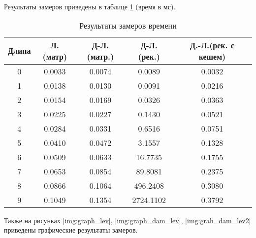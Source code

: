 Результаты замеров приведены в таблице \ref{tbl:time_mes} (время в мс).

\begin{table}[h]
    \begin{center}
        \begin{threeparttable}
        \captionsetup{justification=raggedright,singlelinecheck=off}
        \caption{Результаты замеров времени}
        \label{tbl:time_mes}
        \begin{tabular}{|c|c|c|c|c|}
            \hline
            Длина & Л.(матр) & Д-Л.(матр.)& Д-Л.(рек.) & Д.-Л.(рек. с кешем)  \\
            \hline
            0 & 0.0033 & 0.0074 & 0.0089 & 0.0032 \\
            \hline
            1 & 0.0138 & 0.0130 & 0.0091 & 0.0216 \\ 
            \hline
            2 & 0.0154 & 0.0169 & 0.0326 & 0.0363 \\ 
            \hline
            3 & 0.0225 & 0.0227 & 0.1430 & 0.0521 \\ 
            \hline
            4 & 0.0284 & 0.0331 & 0.6516 & 0.0751 \\ 
            \hline
            5 & 0.0410 & 0.0472 & 3.1557 & 0.1328 \\ 
            \hline
            6 & 0.0509 & 0.0633 & 16.7735 & 0.1755 \\ 
            \hline
            7 & 0.0653 & 0.0854 & 89.8081 & 0.2375 \\ 
            \hline
            8 & 0.0866 & 0.1064 & 496.2408 & 0.3080 \\ 
            \hline
            9 & 0.1049 & 0.1354 & 2724.1102 & 0.3792 \\ 
            \hline
		\end{tabular}
    \end{threeparttable}
\end{center}
\end{table}

Также на рисунках \ref{img:graph_lev}, \ref{img:graph_dam_lev}, \ref{img:grah_dam_lev2} приведены графические результаты замеров.



\clearpage

